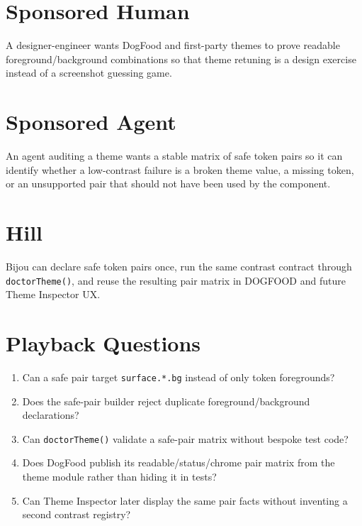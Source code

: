 \section{Sponsored Human}\label{record-180-sponsored-human}

A designer-engineer wants DogFood and first-party themes to prove readable foreground/background combinations so that theme retuning is a design exercise instead of a screenshot guessing game.

\section{Sponsored Agent}\label{record-180-sponsored-agent}

An agent auditing a theme wants a stable matrix of safe token pairs so it can identify whether a low-contrast failure is a broken theme value, a missing token, or an unsupported pair that should not have been used by the component.

\section{Hill}\label{record-180-hill}

Bijou can declare safe token pairs once, run the same contrast contract through \texttt{d\allowbreak{}o\allowbreak{}c\allowbreak{}t\allowbreak{}o\allowbreak{}r\allowbreak{}T\allowbreak{}h\allowbreak{}e\allowbreak{}m\allowbreak{}e\allowbreak{}(\allowbreak{})}, and reuse the resulting pair matrix in DOGFOOD and future Theme Inspector UX.

\section{Playback Questions}\label{record-180-playback-questions}

\begin{enumerate}
\def\labelenumi{\arabic{enumi}.}
\tightlist
\item
  Can a safe pair target \texttt{s\allowbreak{}u\allowbreak{}r\allowbreak{}f\allowbreak{}a\allowbreak{}c\allowbreak{}e\allowbreak{}.\allowbreak{}*\allowbreak{}.\allowbreak{}b\allowbreak{}g} instead of only token foregrounds?
\item
  Does the safe-pair builder reject duplicate foreground/background declarations?
\item
  Can \texttt{d\allowbreak{}o\allowbreak{}c\allowbreak{}t\allowbreak{}o\allowbreak{}r\allowbreak{}T\allowbreak{}h\allowbreak{}e\allowbreak{}m\allowbreak{}e\allowbreak{}(\allowbreak{})} validate a safe-pair matrix without bespoke test code?
\item
  Does DogFood publish its readable/status/chrome pair matrix from the theme module rather than hiding it in tests?
\item
  Can Theme Inspector later display the same pair facts without inventing a second contrast registry?
\end{enumerate}

